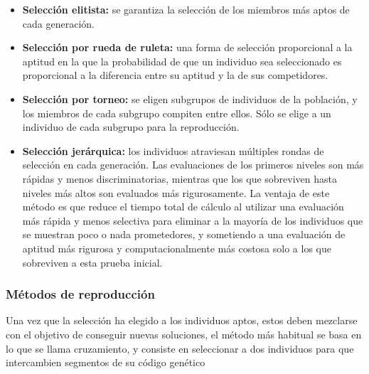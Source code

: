 \begin{itemize}
    \item \textbf{Selección elitista:} se garantiza la selección de los miembros más aptos de 
    cada generación.

    \item \textbf{Selección por rueda de ruleta:} una forma de selección proporcional a la aptitud 
    en la que la probabilidad de que un individuo sea seleccionado es proporcional a la diferencia 
    entre su aptitud y la de sus competidores.

    \item \textbf{Selección por torneo:} se eligen subgrupos de individuos de la población, y los 
    miembros de cada subgrupo compiten entre ellos. Sólo se elige a un individuo de cada subgrupo 
    para la reproducción.

    \item \textbf{Selección jerárquica:} los individuos atraviesan múltiples rondas de selección en 
    cada generación. Las evaluaciones de los primeros niveles son más rápidas y menos 
    discriminatorias, mientras que los que sobreviven hasta niveles más altos son evaluados 
    más rigurosamente. La ventaja de este método es que reduce el tiempo total de cálculo al 
    utilizar una evaluación más rápida y menos selectiva para eliminar a la mayoría de los 
    individuos que se muestran poco o nada prometedores, y sometiendo a una evaluación de aptitud 
    más rigurosa y computacionalmente más costosa solo a los que sobreviven a esta prueba inicial.
\end{itemize}

\subsubsection*{Métodos de reproducción}

Una vez que la selección ha elegido a los individuos aptos, estos deben mezclarse con el objetivo de 
conseguir nuevas soluciones, el método más habitual se basa en lo que se llama cruzamiento, y 
consiste en seleccionar a dos individuos para que intercambien segmentos de su código genético\\ 


